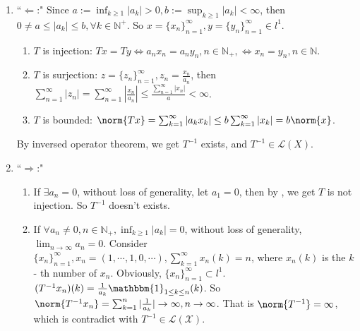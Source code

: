 \documentclass{ctexart}
\begin{document}
\begin{solution}
  \begin{enumerate}
    \item ``\(\Leftarrow\):" Since \(a:=\inf_{k \geq 1}|a_k| >0,b:= \sup_{k \geq 1} |a_k|< \infty \), 
      then \(0 \neq a \leq |a_k| \leq b, \forall k \in \mathbb{N}^+\). So \(x=\{x_n\}_{n=1}^{\infty}, y = \{y_n\}_{n=1}^{\infty} \in l^{1}\). 
      \begin{enumerate}
        \item \label{it:1} \(T\) is injection: \(T x= T y \iff a_nx_n=a_ny_n, n \in \mathbb{N}_+, \iff x_n=y_n, n \in \mathbb{N}\).
        \item \label{it:2}\(T\) is surjection: \(z = \{z_n\}_{n=1}^{\infty}, z_n=\frac{x_n}{a_n}\), then 
      \(\sum_{n=1}^{\infty} |z_n| =\sum_{n=1}^{\infty} |\frac{x_n}{a_n}|\leq \frac{\sum_{n=1}^{\infty}|x_n|}{a} < \infty \).
        \item \label{it:3} \(T\) is bounded: \(\norm{T x}=\sum_{k=1}^{\infty} |a_kx_k| \leq b \sum_{k=1}^{\infty} |x_k|=b \norm{x}\).
      \end{enumerate}
      By inversed operator theorem, we get \(T^{-1}\) exists, and \(T^{-1} \in \mathcal{L} (X)\).
    \item ``\(\Rightarrow\):"\begin{enumerate}
        \item If \(\exists a_n=0\), without loss of generality, let \(a_1=0\), then by , 
          we get \(T\) is not injection. So \(T^{-1}\) doesn't exists.
        \item If \(\forall a_n \neq 0, n \in \mathbb{N}_+, \inf_{k \geq 1}|a_k|=0  \), without loss of generality, 
          \(\lim_{n \to \infty} a_n =0\). Consider \(\{x_n\}_{n=1}^{\infty}, x_n = (1,\cdots,1,0,\cdots), \sum_{k=1}^{\infty} x_n(k) = n\), 
          where \(x_n(k)\) is the \(k\)- th number of \(x_n\). Obviously, 
          \(\{x_n\}_{n=1}^{\infty} \subset l^1\). \((T^{-1}x_n)(k) = \frac{1}{a_k} \mathbbm{1}_{1 \leq k \leq n}(k)\).
          So \(\norm{T^{-1}x_n} = \sum_{k=1}^{n} |\frac{1}{a_k}| \to \infty , n \to \infty\).
          That is \(\norm{T^{-1}} = \infty\), which is contradict with \(T^{-1} \in \mathcal{L}(\mathcal{X})\).

      \end{enumerate}


  \end{enumerate}
\end{solution}
\end{document}
